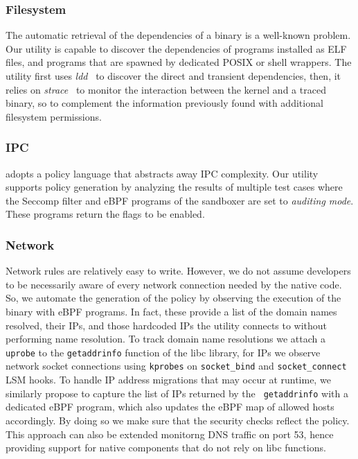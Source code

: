 \subsubsection*{Filesystem}

The automatic retrieval of the dependencies of a binary is a
well-known problem. Our utility is capable to discover the
dependencies of programs installed as ELF files, and programs that are
spawned by dedicated POSIX or shell wrappers. The utility first uses
{\em ldd}~\cite{linux-ldd} to discover the direct and transient
dependencies, then, it relies on {\em strace}~\cite{linux-strace} to
monitor the interaction between the kernel and a traced binary, so to
complement the information previously found with additional
filesystem permissions.

\subsubsection*{IPC}

\natisand adopts a policy language that abstracts away IPC complexity.  Our
utility supports policy generation by analyzing the results of
multiple test cases where the Seccomp filter and eBPF
programs of the sandboxer are set to {\em auditing mode}.  These
programs return the flags to be enabled.

\subsubsection*{Network}

Network rules are relatively easy to write. However, we do not
assume developers to be necessarily aware of every network connection
needed by the native code. So, we automate the generation of the
policy by observing the execution of the binary with eBPF programs.
In fact, these provide a list of the domain names resolved, their IPs,
and those hardcoded IPs the utility connects to without performing
name resolution. To track domain name resolutions we attach a {\tt 
  uprobe} to the {\tt getaddrinfo} function of the libc library,
for IPs we observe network socket connections using {\tt kprobes} on
{\tt socket\_bind} and {\tt socket\_connect} LSM hooks.
%
 To handle IP address migrations that may occur at runtime,
  we similarly propose to capture the list of IPs returned by the {\tt
    getaddrinfo} with a dedicated eBPF program, which also updates the
  eBPF map of allowed hosts accordingly. By doing so we make sure that
  the security checks reflect the policy. This approach can also be
  extended monitorng DNS traffic on port 53, hence providing support
  for native components that do not rely on libc functions.  

